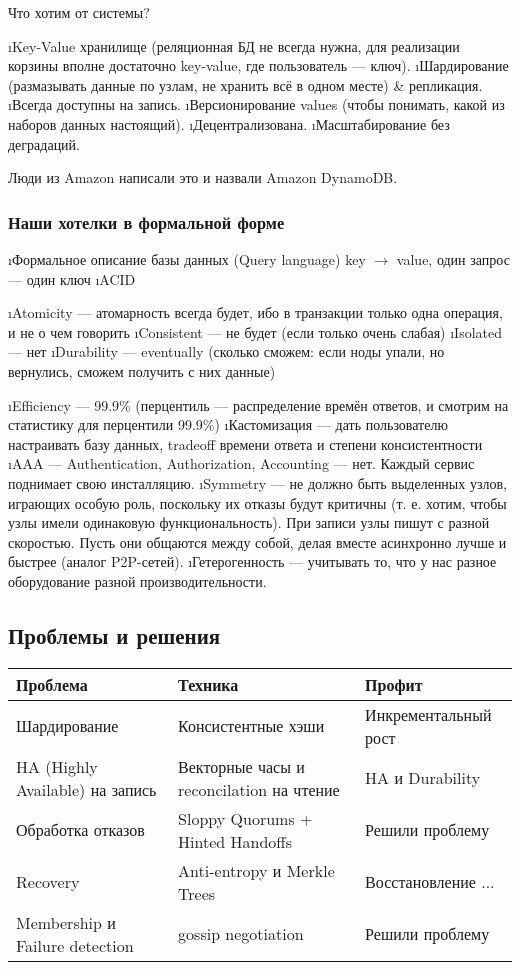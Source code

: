 Что хотим от системы?
\begin{enumerate}
\i Key-Value хранилище (реляционная БД не всегда нужна, для реализации корзины вполне достаточно key-value, где пользователь --- ключ).
\i Шардирование (размазывать данные по узлам, не хранить всё в одном месте) \& репликация.
\i Всегда доступны на запись.
\i Версионирование values (чтобы понимать, какой из наборов данных настоящий).
\i Децентрализована.
\i Масштабирование без деградаций.
\end{enumerate}

Люди из Amazon написали это и назвали Amazon DynamoDB.

\subsubsection{Наши хотелки в формальной форме}
\begin{enumerate}
\i Формальное описание базы данных (Query language)
key $\to$ value, один запрос --- один ключ
\i ACID 
\begin{enumerate}
\i Atomicity --- атомарность всегда будет, ибо в транзакции только одна операция, и не о чем говорить
\i Consistent --- не будет (если только очень слабая)
\i Isolated --- нет
\i Durability --- eventually (сколько сможем: если ноды упали, но вернулись, сможем получить с них данные)
\end{enumerate}
\i Efficiency --- 99.9\% (перцентиль --- распределение времён ответов, и смотрим на статистику для перцентили 99.9\%)
\i Кастомизация --- дать пользователю настраивать базу данных, tradeoff времени ответа и степени консистентности
\i AAA --- Authentication, Authorization, Accounting --- нет. Каждый сервис поднимает свою инсталляцию.
\i Symmetry --- не должно быть выделенных узлов, играющих особую роль, поскольку их отказы будут критичны (т. е. хотим, чтобы узлы имели одинаковую функциональность).
При записи узлы пишут с разной скоростью. Пусть они общаются между собой, делая вместе асинхронно лучше и быстрее (аналог P2P-сетей).
\i Гетерогенность --- учитывать то, что у нас разное оборудование разной производительности.
\end{enumerate}

\subsection{Проблемы и решения}

\begin{tabular}{|l|l|l|}
\hline
Проблема & Техника & Профит \\ \hline
Шардирование & Консистентные хэши & Инкрементальный рост \\ \hline
HA (Highly Available) на запись & Векторные часы и reconcilation на чтение & HA и Durability\\ \hline
Обработка отказов & Sloppy Quorums + Hinted Handoffs & Решили проблему \\ \hline
Recovery & Anti-entropy и Merkle Trees & Восстановление ... \\ \hline
Membership и Failure detection & gossip negotiation & Решили проблему \\ \hline
\end{tabular}

